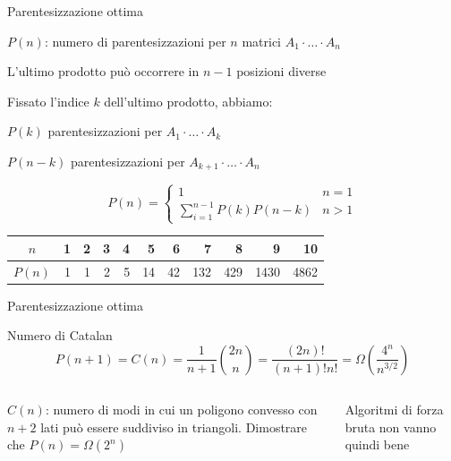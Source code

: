 \begin{frame}{Parentesizzazione ottima}
\BIL
\item $P(n)$: numero di parentesizzazioni per $n$ matrici $A_1 \cdot \ldots \cdot A_n$
\item L'ultimo prodotto può occorrere in $n-1$ posizioni diverse
\item Fissato l'indice $k$ dell'ultimo prodotto, abbiamo:
\BI
\item $P(k)$ parentesizzazioni per $A_1 \cdot \ldots \cdot A_k$
\item $P(n-k)$ parentesizzazioni per $A_{k+1} \cdot \ldots \cdot A_n$
\EI
\EIL

\[
  P(n) = \begin{cases}
    1 & n = 1 \\
    \sum_{i=1}^{n-1} P(k)P(n-k) & n>1
    \end{cases}
\]

\smallskip
\begin{center}
\begin{tabular}{|c|r|r|r|r|r|r|r|r|r|r|}
\hline
$n$ & \phantom{00}1 & \phantom{00}2 & \phantom{00}3 & \phantom{00}4 & \phantom{00}5 & \phantom{00}6 & \phantom{00}7 & \phantom{00}8 & \phantom{00}9 & \phantom{0}10 \\\hline
$P(n)$ & 1 & 1 & 2 & 5 & 14 & 42 & 132 & 429 & 1430 & 4862 \\\hline
\end{tabular}
\end{center}
\end{frame}

\begin{frame}{Parentesizzazione ottima}

\vspace{-6pt}
\begin{block}{Numero di Catalan}
\[
P(n+1) = C(n) = \frac{1}{n+1} {2n\choose n} = \frac{(2n)!}{(n+1)!n!} = \Omega\left(\frac{4^n}{n^{3/2}}\right)
\]
\end{block}

\begin{columns}[T]
$C(n)$: numero di modi in cui un poligono convesso con $n+2$ lati può essere suddiviso in triangoli.
Dimostrare che $P(n) = \Omega(2^n)$

\bigskip
{}
Algoritmi di forza bruta non vanno quindi bene
\end{columns}

\end{frame}

